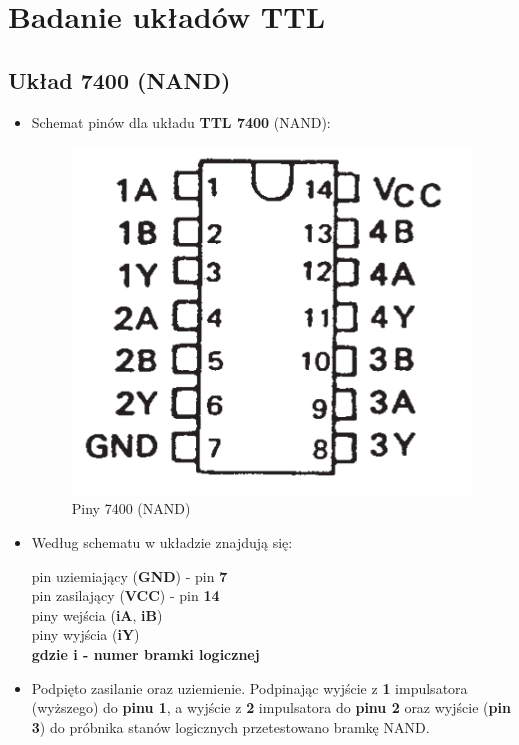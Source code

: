 \chapter{Badanie układów TTL}

\section{Układ 7400 (NAND)}

\begin{itemize}
    \item Schemat pinów dla układu \textbf{TTL 7400} (NAND):
        \begin{figure}[H]
            \centering
            \includegraphics[scale=0.25]{img/schemes/NAND_7400_pins.png}
            \caption{Piny 7400 (NAND)}
            \label{NAND:piny}
        \end{figure}
    \item Według schematu w układzie znajdują się: 
        \begin{center}
            pin uziemiający (\textbf{GND}) - pin \textbf{7} \\
            pin zasilający (\textbf{VCC}) - pin \textbf{14} \\
            piny wejścia (\textbf{iA}, \textbf{iB}) \\
            piny wyjścia (\textbf{iY}) \\
            \textbf{gdzie i - numer bramki logicznej}
        \end{center}
    \item Podpięto zasilanie oraz uziemienie. Podpinając wyjście z \textbf{1} impulsatora (wyższego) do \textbf{pinu 1}, a wyjście z \textbf{2} impulsatora do \textbf{pinu 2} oraz wyjście (\textbf{pin 3}) do próbnika stanów logicznych przetestowano bramkę NAND.

\end{itemize}
